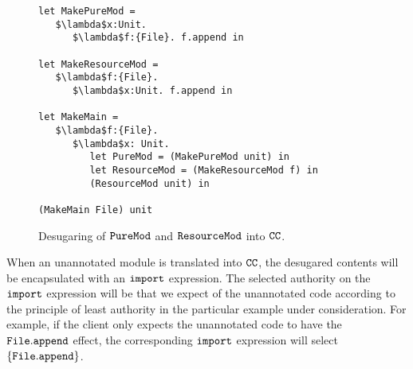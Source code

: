 \begin{figure}[h]

\begin{lstlisting}
let MakePureMod =
   $\lambda$x:Unit.
      $\lambda$f:{File}. f.append in

let MakeResourceMod =
   $\lambda$f:{File}.
      $\lambda$x:Unit. f.append in

let MakeMain =
   $\lambda$f:{File}.
      $\lambda$x: Unit.
         let PureMod = (MakePureMod unit) in
         let ResourceMod = (MakeResourceMod f) in
         (ResourceMod unit) in

(MakeMain File) unit
\end{lstlisting}

\caption{Desugaring of $\mathtt{PureMod}$ and $\mathtt{ResourceMod}$ into $\mathtt{CC}$.}
\label{fig:wyv_tutorial_desugaring}
\end{figure}

When an unannotated module is translated into $\mathtt{CC}$, the desugared contents will be encapsulated with an $\mathtt{import}$ expression. The selected authority on the $\mathtt{import}$ expression will be that we expect of the unannotated code according to the principle of least authority in the particular example under consideration. For example, if the client only expects the unannotated code to have the $\mathtt{File.append}$ effect, the corresponding $\mathtt{import}$ expression will select $\mathtt{\{File.append\}}$.
